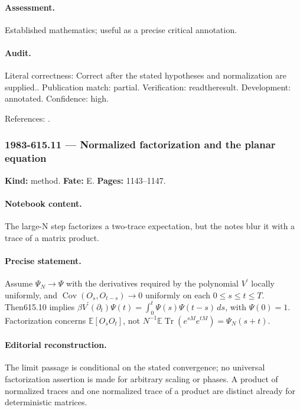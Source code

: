 \paragraph{Assessment.} Established mathematics; useful as a precise critical annotation.

\paragraph{Audit.} Literal correctness: Correct after the stated hypotheses and normalization are supplied.. Publication match: partial. Verification: readtheresult. Development: annotated. Confidence: high.

\noindent References: \citep{brezinitzyksonparisizuber1978planar}.\par

\subsubsection{1983-615.11 --- Normalized factorization and the planar equation}

\label{item:1983-615.11}

\noindent\textbf{Kind:} method. \textbf{Fate:} E. \textbf{Pages:} 1143--1147.\par

\paragraph{Notebook content.} The large-N step factorizes a two-trace expectation, but the notes blur it with a trace of a matrix product.

\paragraph{Precise statement.} Assume $\Psi_N\to\Psi$ with the derivatives required by the polynomial $V^{\prime}$ locally uniformly, and $\operatorname{Cov}(O_s,O_{t-s})\to0$ uniformly on each $0\le s\le t\le T$. Then615.10 implies $\beta V^{\prime}(\partial_t)\Psi(t)=\int_0^t\Psi(s)\Psi(t-s)\,ds$, with $\Psi(0)=1$. Factorization concerns $\mathbb E[O_sO_t]$, not $N^{-1}\mathbb E\operatorname{Tr}(e^{sM}e^{tM})=\Psi_N(s+t)$.

\paragraph{Editorial reconstruction.} The limit passage is conditional on the stated convergence; no universal factorization assertion is made for arbitrary scaling or phases. A product of normalized traces and one normalized trace of a product are distinct already for deterministic matrices.

